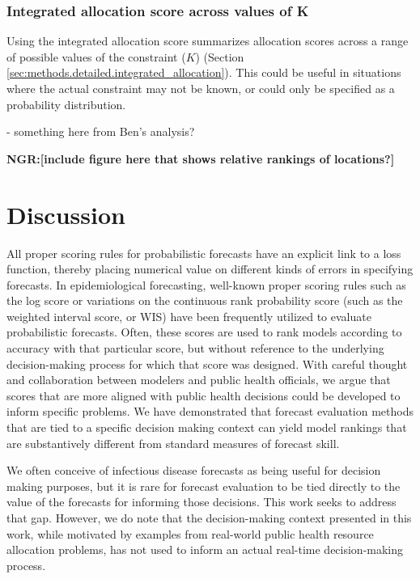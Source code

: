 \documentclass{article}\usepackage[]{graphicx}\usepackage[]{xcolor}
\def\ngr#1{{\color{blue}\textbf{NGR:[#1]}}}
\begin{document}
\subsubsection{Integrated allocation score across values of K}

Using the integrated allocation score summarizes allocation scores across a range of possible values of the constraint ($K$) (Section \ref{sec:methods.detailed.integrated_allocation}).
This could be useful in situations where the actual constraint may not be known, or could only be specified as a probability distribution.

 - something here from Ben's analysis?


\ngr{include figure here that shows relative rankings of locations?}

\section{Discussion}
\label{sec:discussion}

All proper scoring rules for probabilistic forecasts have an explicit link to a loss function, thereby placing numerical value on different kinds of errors in specifying forecasts.
In epidemiological forecasting, well-known proper scoring rules such as the log score or variations on the continuous rank probability score (such as the weighted interval score, or WIS) have been frequently utilized to evaluate probabilistic forecasts.
Often, these scores are used to rank models according to accuracy with that particular score, but without reference to the underlying decision-making process for which that score was designed.
With careful thought and collaboration between modelers and public health officials, we argue that scores that are more aligned with public health decisions could be developed to inform specific problems.
We have demonstrated that forecast evaluation methods that are tied to a specific decision making context can yield model rankings that are substantively different from standard measures of forecast skill.

We often conceive of infectious disease forecasts as being useful for decision making purposes, but it is rare for forecast evaluation to be tied directly to the value of the forecasts for informing those decisions. This work seeks to address that gap.
However, we do note that the decision-making context presented in this work, while motivated by examples from real-world public health resource allocation problems, has not used to inform an actual real-time decision-making process.
\end{document}
